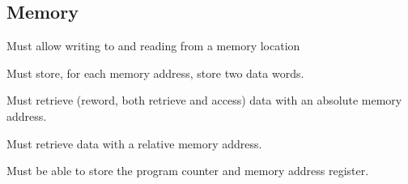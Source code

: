\subsection{Memory}

\begin{feat-requirement}
Must allow writing to and reading from a memory location
\end{feat-requirement}

\begin{feat-requirement}
Must store, for each memory address, store two data words. 
\end{feat-requirement}

\begin{feat-requirement}
Must retrieve (reword, both retrieve and access) data with an absolute memory address. 
\end{feat-requirement}

\begin{feat-requirement}
Must retrieve data with a relative memory address. 
\end{feat-requirement}

\begin{feat-requirement}
    Must be able to store the program counter and memory address register.
\end{feat-requirement}